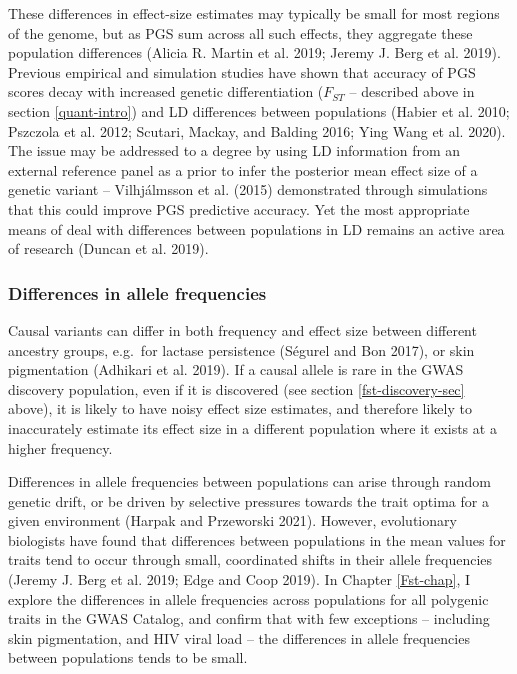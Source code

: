 \documentclass[
]{book}
\begin{document}
These differences in effect-size estimates may typically be small for most regions of the genome, but as PGS sum across all such effects, they aggregate these population differences (Alicia R. Martin et al. 2019; Jeremy J. Berg et al. 2019). Previous empirical and simulation studies have shown that accuracy of PGS scores decay with increased genetic differentiation (\(F_{ST}\) -- described above in section \ref{quant-intro}) and LD differences between populations (Habier et al. 2010; Pszczola et al. 2012; Scutari, Mackay, and Balding 2016; Ying Wang et al. 2020). The issue may be addressed to a degree by using LD information from an external reference panel as a prior to infer the posterior mean effect size of a genetic variant -- Vilhjálmsson et al. (2015) demonstrated through simulations that this could improve PGS predictive accuracy. Yet the most appropriate means of deal with differences between populations in LD remains an active area of research (Duncan et al. 2019).

\hypertarget{differences-in-allele-frequencies}{%
\subsubsection{Differences in allele frequencies}\label{differences-in-allele-frequencies}}

Causal variants can differ in both frequency and effect size between different ancestry groups, e.g.~for lactase persistence (Ségurel and Bon 2017), or skin pigmentation (Adhikari et al. 2019). If a causal allele is rare in the GWAS discovery population, even if it is discovered (see section \ref{fst-discovery-sec} above), it is likely to have noisy effect size estimates, and therefore likely to inaccurately estimate its effect size in a different population where it exists at a higher frequency.

Differences in allele frequencies between populations can arise through random genetic drift, or be driven by selective pressures towards the trait optima for a given environment (Harpak and Przeworski 2021). However, evolutionary biologists have found that differences between populations in the mean values for traits tend to occur through small, coordinated shifts in their allele frequencies (Jeremy J. Berg et al. 2019; Edge and Coop 2019). In Chapter \ref{Fst-chap}, I explore the differences in allele frequencies across populations for all polygenic traits in the GWAS Catalog, and confirm that with few exceptions -- including skin pigmentation, and HIV viral load -- the differences in allele frequencies between populations tends to be small.
\end{document}
